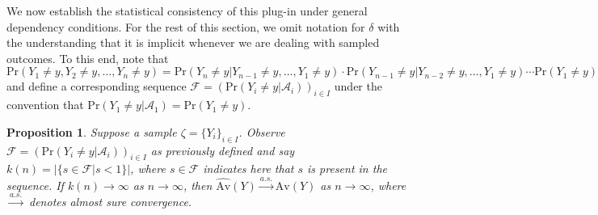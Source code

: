 \documentclass[12pt]{amsart}
\theoremstyle{plain}%
\newtheorem{proposition}{Proposition}
\theoremstyle{definition}
\theoremstyle{remark}
\numberwithin{equation}{section}
\begin{document}
We now establish the statistical consistency of this plug-in under general dependency conditions. For the rest of this section, we omit notation for $\delta$ with the understanding that it is implicit whenever we are dealing with sampled outcomes. To this end, note that $\text{Pr}(Y_1 \neq y, Y_2 \neq y, \ldots, Y_n \neq y) = \text{Pr}(Y_n \neq y | Y_{n-1} \neq y, \ldots, Y_1 \neq y) \cdot \text{Pr}(Y_{n-1} \neq y | Y_{n-2} \neq y, \ldots, Y_1 \neq y) \cdots \text{Pr}(Y_1 \neq y)$ and define a corresponding sequence $\mathcal{F} =(\text{Pr}(Y_i \neq y| \mathcal{A}_i))_{i \in I}$ under the convention that $\text{Pr}(Y_1 \neq y| \mathcal{A}_1) = \text{Pr}(Y_1 \neq y)$.
\begin{proposition}
Suppose a sample $\zeta = \{ Y_i \}_{i \in I}$. Observe $\mathcal{F} =(\text{Pr}(Y_i \neq y| \mathcal{A}_i))_{i \in I}$ as previously defined and say $k(n) =|\{ s \in \mathcal{F} | s < 1 \}|$, where $s \in \mathcal{F}$ indicates here that $s$ is present in the sequence. If $k(n) \to \infty$ as $n \to \infty$, then $\hat{\text{Av}}(Y) \overset{a.s.}{\to} \text{Av}(Y)$ as $n \to \infty$, where $\overset{a.s.}{\to}$ denotes almost sure convergence.
\end{proposition}
\end{document}
